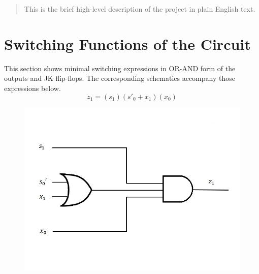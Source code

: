 \documentclass{article}
\begin{document}
\begin{abstract}
This is the brief high-level description of the project in plain English text.
\end{abstract}


\section{Switching Functions of the Circuit}
This section shows minimal switching expressions in OR-AND form of the 
outputs and JK flip-flops. The corresponding schematics accompany those
expressions below.\\

\begin{equation*}
z_1 = (s_1)(s'_0 + x_1)(x_0)
\end{equation*}
\begin{figure}[h!]
\centering
\includegraphics[scale=0.3]{z1}
\end{figure}
\end{document}

